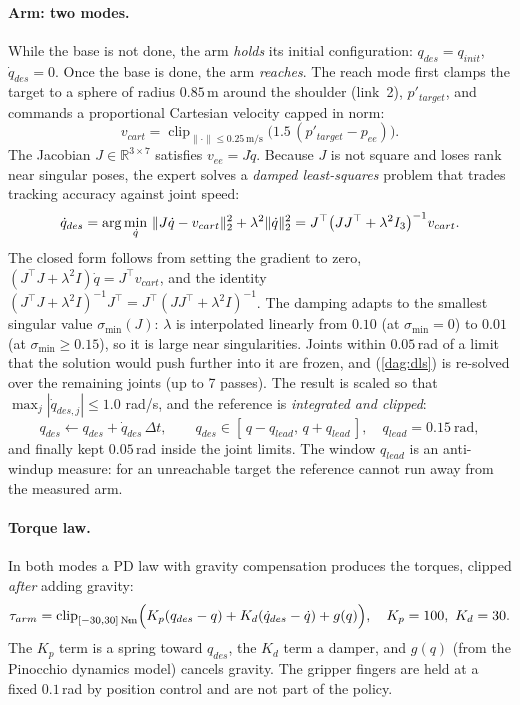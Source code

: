 \paragraph{Arm: two modes.} While the base is not done, the arm \emph{holds} its initial configuration: $q_{des}=q_{init}$, $\dot q_{des}=0$. Once the base is done, the arm \emph{reaches}. The reach mode first clamps the target to a sphere of radius $0.85$\,m around the shoulder (link~2), $p'_{target}$, and commands a proportional Cartesian velocity capped in norm:
\begin{equation}
  v_{cart}=\operatorname{clip}_{\lVert\cdot\rVert\le0.25\,\text{m/s}}\bigl(1.5\,(p'_{target}-p_{ee})\bigr).
  \label{dag:vcart}
\end{equation}
The Jacobian $J\in\mathbb{R}^{3\times7}$ satisfies $v_{ee}=J\dot q$. Because $J$ is not square and loses rank near singular poses, the expert solves a \emph{damped least-squares} problem that trades tracking accuracy against joint speed:
\begin{equation}
  \dot q_{des}=\arg\min_{\dot q}\ \lVert J\dot q-v_{cart}\rVert_2^{2}+\lambda^{2}\lVert \dot q\rVert_2^{2}
  =J^{\top}\bigl(JJ^{\top}+\lambda^{2}I_3\bigr)^{-1}v_{cart}.
  \label{dag:dls}
\end{equation}
The closed form follows from setting the gradient to zero, $(J^{\top}J+\lambda^{2}I)\dot q=J^{\top}v_{cart}$, and the identity $(J^{\top}J+\lambda^{2}I)^{-1}J^{\top}=J^{\top}(JJ^{\top}+\lambda^{2}I)^{-1}$. The damping adapts to the smallest singular value $\sigma_{\min}(J)$: $\lambda$ is interpolated linearly from $0.10$ (at $\sigma_{\min}=0$) to $0.01$ (at $\sigma_{\min}\ge0.15$), so it is large near singularities. Joints within $0.05$\,rad of a limit that the solution would push further into it are frozen, and (\ref{dag:dls}) is re-solved over the remaining joints (up to 7 passes). The result is scaled so that $\max_j|\dot q_{des,j}|\le1.0$ rad/s, and the reference is \emph{integrated and clipped}:
\begin{equation}
  q_{des}\leftarrow q_{des}+\dot q_{des}\,\Delta t,\qquad
  q_{des}\in[\,q-q_{lead},\,q+q_{lead}\,],\quad q_{lead}=0.15\ \text{rad},
  \label{dag:qlead}
\end{equation}
and finally kept $0.05$\,rad inside the joint limits. The window $q_{lead}$ is an anti-windup measure: for an unreachable target the reference cannot run away from the measured arm.

\paragraph{Torque law.} In both modes a PD law with gravity compensation produces the torques, clipped \emph{after} adding gravity:
\begin{equation}
  \tau_{arm}=\operatorname{clip}_{[-30,30]\,\mathrm{N\!\cdot\!m}}\Bigl(K_p(q_{des}-q)+K_d(\dot q_{des}-\dot q)+g(q)\Bigr),\quad K_p=100,\ K_d=30.
  \label{dag:pd}
\end{equation}
The $K_p$ term is a spring toward $q_{des}$, the $K_d$ term a damper, and $g(q)$ (from the Pinocchio dynamics model) cancels gravity. The gripper fingers are held at a fixed $0.1$\,rad by position control and are not part of the policy.

